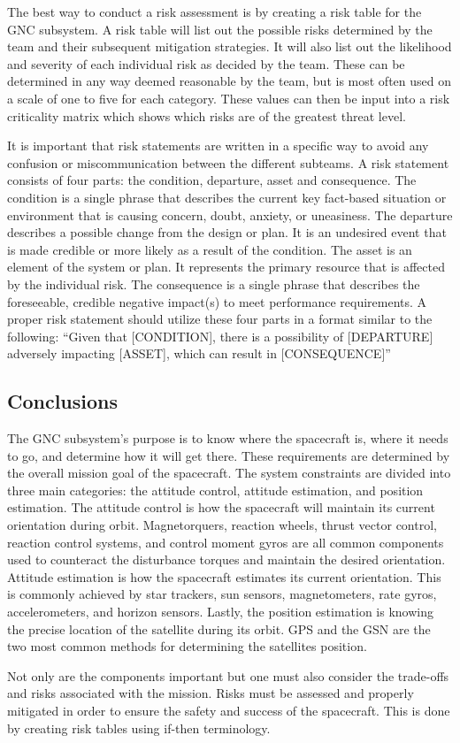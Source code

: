 The best way to conduct a risk assessment is by creating a risk table
for the GNC subsystem. A risk table will list out the possible risks
determined by the team and their subsequent mitigation strategies. It
will also list out the likelihood and severity of each individual risk
as decided by the team. These can be determined in any way deemed
reasonable by the team, but is most often used on a scale of one to
five for each category. These values can then be input into a risk
criticality matrix which shows which risks are of the greatest threat
level.  

It is important that risk statements are written in a specific way to
avoid any confusion or miscommunication between the different
subteams. A risk statement consists of four parts: the condition,
departure, asset and consequence. The condition is a single phrase
that describes the current key fact-based situation or environment
that is causing concern, doubt, anxiety, or uneasiness. The departure
describes a possible change from the design or plan. It is an
undesired event that is made credible or more likely as a result of
the condition. The asset is an element of the system or plan. It
represents the primary resource that is affected by the individual
risk. The consequence is a single phrase that describes the
foreseeable, credible negative impact(s) to meet performance
requirements. A proper risk statement should utilize these four parts
in a format similar to the following: “Given that [CONDITION], there
is a possibility of [DEPARTURE] adversely impacting [ASSET], which can
result in [CONSEQUENCE]”

\subsection{Conclusions}

The GNC subsystem's purpose is to know where the spacecraft is, where
it needs to go, and determine how it will get there. These
requirements are determined by the overall mission goal of the
spacecraft. The system constraints are divided into three main
categories: the attitude control, attitude estimation, and position
estimation. The attitude control is how the spacecraft will maintain
its current orientation during orbit. Magnetorquers, reaction wheels,
thrust vector control, reaction control systems, and control moment
gyros are all common components used to counteract the disturbance
torques and maintain the desired orientation. Attitude estimation is
how the spacecraft estimates its current orientation. This is commonly
achieved by star trackers, sun sensors, magnetometers, rate gyros,
accelerometers, and horizon sensors. Lastly, the position estimation
is knowing the precise location of the satellite during its orbit. GPS
and the GSN are the two most common methods for determining the
satellites position.  

Not only are the components important but one must also consider the
trade-offs and risks associated with the mission. Risks must be
assessed and properly mitigated in order to ensure the safety and
success of the spacecraft. This is done by creating risk tables using
if-then terminology.
